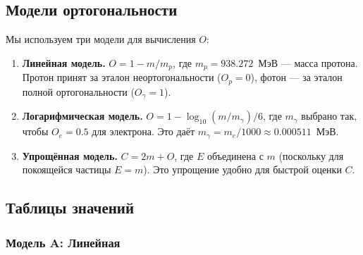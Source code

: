 \documentclass[12pt,a4paper]{article}
\begin{document}
\subsection{Модели ортогональности}

Мы используем три модели для вычисления $O$:

\begin{enumerate}[label=\textbf{Модель \Alph*:}]
    \item \textbf{Линейная модель.} $O = 1 - m/m_p$, где $m_p = 938.272$~МэВ --- масса протона. Протон принят за эталон неортогональности ($O_p = 0$), фотон --- за эталон полной ортогональности ($O_\gamma = 1$).
    \item \textbf{Логарифмическая модель.} $O = 1 - \log_{10}(m/m_\gamma) / 6$, где $m_\gamma$ выбрано так, чтобы $O_e = 0.5$ для электрона. Это даёт $m_\gamma = m_e / 1000 \approx 0.000511$~МэВ.
    \item \textbf{Упрощённая модель.} $C = 2m + O$, где $E$ объединена с $m$ (поскольку для покоящейся частицы $E = m$). Это упрощение удобно для быстрой оценки $C$.
\end{enumerate}

\subsection{Таблицы значений}

\subsubsection{Модель A: Линейная}
\end{document}
